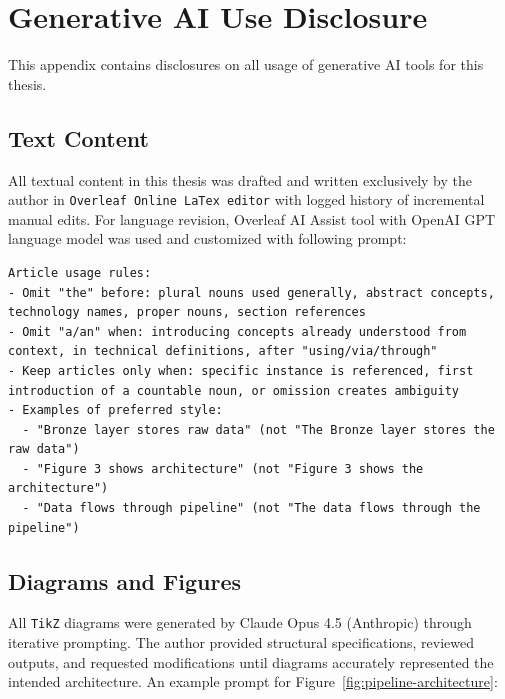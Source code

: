 \chapter{Generative AI Use Disclosure}
\label{app:genai}

This appendix contains disclosures on all usage of generative AI tools for this thesis.

\section{Text Content}

All textual content in this thesis was drafted and written exclusively by the author in \texttt{Overleaf Online LaTex editor} with logged history of incremental manual edits. For language revision, Overleaf AI Assist tool with OpenAI GPT language model was used and customized with following prompt:

\begin{lstlisting}[frame=single, backgroundcolor=\color{backcolour}, rulecolor=\color{framecolour}, basicstyle=\small\ttfamily, breaklines=true]
Article usage rules:
- Omit "the" before: plural nouns used generally, abstract concepts, technology names, proper nouns, section references
- Omit "a/an" when: introducing concepts already understood from context, in technical definitions, after "using/via/through"
- Keep articles only when: specific instance is referenced, first introduction of a countable noun, or omission creates ambiguity
- Examples of preferred style:
  - "Bronze layer stores raw data" (not "The Bronze layer stores the raw data")
  - "Figure 3 shows architecture" (not "Figure 3 shows the architecture")
  - "Data flows through pipeline" (not "The data flows through the pipeline")
\end{lstlisting}

\section{Diagrams and Figures}

All \texttt{TikZ} diagrams were generated by Claude Opus 4.5 (Anthropic) through iterative prompting. The author provided structural specifications, reviewed outputs, and requested modifications until diagrams accurately represented the intended architecture. An example prompt for Figure~\ref{fig:pipeline-architecture}:

